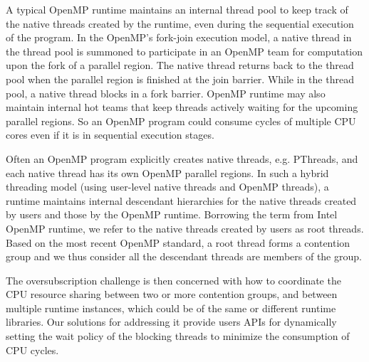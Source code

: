 
A typical OpenMP runtime maintains 
an internal thread pool to keep track of the native threads created by the runtime, 
even during the sequential execution of the program. 
In the OpenMP's fork-join execution model, a native thread in the thread pool 
is summoned to participate in an OpenMP team for computation upon the fork of a {\sf parallel} region. 
The native thread returns back to the thread pool when the {\sf parallel} 
region is finished at the join barrier. While in the 
thread pool, a native thread blocks in a fork barrier. 
OpenMP runtime may also
maintain internal hot teams that keep threads actively waiting for the upcoming {\sf parallel} regions. 
So an OpenMP program could consume cycles of multiple CPU cores even if it is in sequential execution stages.

Often an OpenMP program explicitly creates native threads, e.g. PThreads, and each native thread has
its own OpenMP {\sf parallel} regions. 
In such a hybrid threading model (using user-level native threads and OpenMP threads), 
a runtime maintains internal descendant hierarchies for the native threads created by users and
those by the OpenMP runtime. Borrowing the term from Intel OpenMP runtime, we refer to 
the native threads created by users as root threads. 
Based on the most recent OpenMP standard, a root thread forms a contention group and we thus 
consider all the descendant threads are members of the group. 


The oversubscription challenge is then concerned with how 
to coordinate the CPU resource sharing between two or more contention groups, and between multiple 
runtime instances, which could be of the same or different runtime libraries. 
Our solutions for addressing it provide users APIs for 
dynamically setting the wait policy of the blocking threads to minimize 
the consumption of CPU cycles. %


